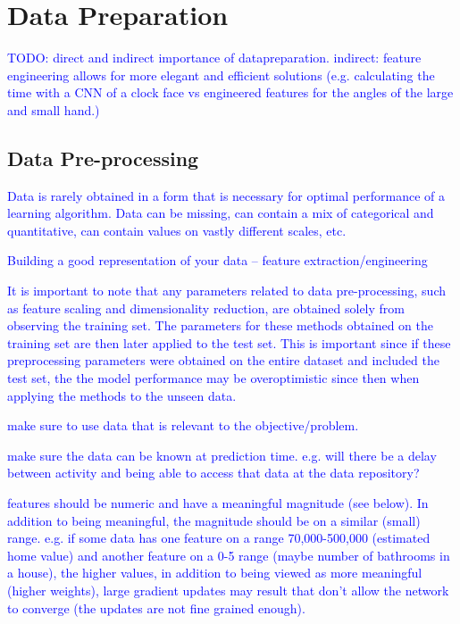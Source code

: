 \section{Data Preparation}

\textcolor{blue}{TODO: direct and indirect importance of datapreparation. indirect: feature engineering allows for more elegant and efficient solutions (e.g. calculating the time with a CNN of a clock face vs engineered features for the angles of the large and small hand.) }

\subsection{Data Pre-processing}

\textcolor{blue}{Data is rarely obtained in a form that is necessary for optimal performance of a learning algorithm. Data can be missing, can contain a mix of categorical and quantitative, can contain values on vastly different scales, etc.}

\textcolor{blue}{Building a good representation of your data -- feature extraction/engineering}

\textcolor{blue}{It is important to note that any parameters related to data pre-processing, such as feature scaling and dimensionality reduction, are obtained solely from observing the training set. The parameters for these methods obtained on the training set are then later applied to the test set. This is important since if these preprocessing parameters were obtained on the entire dataset and included the test set, the the model performance may be overoptimistic since then when applying the methods to the unseen data.}

\textcolor{blue}{make sure to use data that is relevant to the objective/problem.}


\textcolor{blue}{make sure the data can be known at prediction time. e.g. will there be a delay between activity and being able to access that data at the data repository?}


\textcolor{blue}{features should be numeric and have a meaningful magnitude (see below). In addition to being meaningful, the magnitude should be on a similar (small) range. e.g. if some data has one feature on a range 70,000-500,000 (estimated home value) and another feature on a 0-5 range (maybe number of bathrooms in a house), the higher values, in addition to being viewed as more meaningful (higher weights), large gradient updates may result that don't allow the network to converge (the updates are not fine grained enough).}

